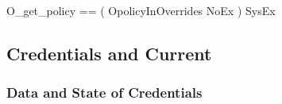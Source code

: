 
\begin{zed}
  O\_get\_policy == ( OpolicyInOverrides \land NoEx ) \lor SysEx \\
\end{zed}


\subsection{Credentials and Current \label{sec:Credentials}}

\vspace{2ex}


\subsubsection{Data and State of Credentials}

